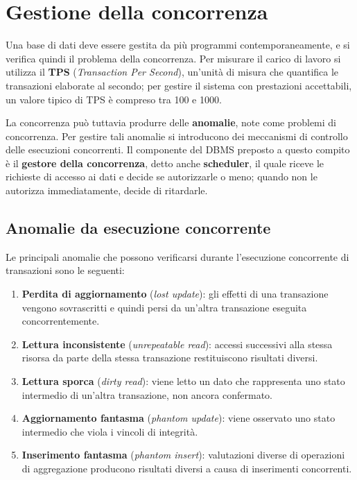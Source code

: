 \section{Gestione della concorrenza}

Una base di dati deve essere gestita da più programmi contemporaneamente, e si verifica quindi il problema della concorrenza. Per misurare il carico di lavoro si utilizza il \textbf{TPS} (\textit{Transaction Per Second}), un'unità di misura che quantifica le transazioni elaborate al secondo; per gestire il sistema con prestazioni accettabili, un valore tipico di TPS è compreso tra 100 e 1000.

La concorrenza può tuttavia produrre delle \textbf{anomalie}, note come problemi di concorrenza. Per gestire tali anomalie si introducono dei meccanismi di controllo delle esecuzioni concorrenti. Il componente del DBMS preposto a questo compito è il \textbf{gestore della concorrenza}, detto anche \textbf{scheduler}, il quale riceve le richieste di accesso ai dati e decide se autorizzarle o meno; quando non le autorizza immediatamente, decide di ritardarle.
\subsection{Anomalie da esecuzione concorrente}

Le principali anomalie che possono verificarsi durante l'esecuzione concorrente di transazioni sono le seguenti:

\begin{enumerate}
	\item \textbf{Perdita di aggiornamento} (\textit{lost update}): gli effetti di una transazione vengono sovrascritti e quindi persi da un'altra transazione eseguita concorrentemente.
	\item \textbf{Lettura inconsistente} (\textit{unrepeatable read}): accessi successivi alla stessa risorsa da parte della stessa transazione restituiscono risultati diversi.
	\item \textbf{Lettura sporca} (\textit{dirty read}): viene letto un dato che rappresenta uno stato intermedio di un'altra transazione, non ancora confermato.
	\item \textbf{Aggiornamento fantasma} (\textit{phantom update}): viene osservato uno stato intermedio che viola i vincoli di integrità.
	\item \textbf{Inserimento fantasma} (\textit{phantom insert}): valutazioni diverse di operazioni di aggregazione producono risultati diversi a causa di inserimenti concorrenti.
\end{enumerate}

